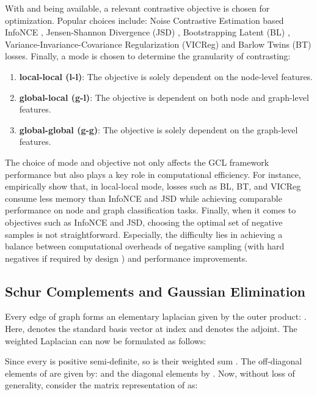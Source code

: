 \documentclass{article}
\theoremstyle{plain}
\theoremstyle{definition}
\theoremstyle{remark}
\begin{document}
With  and  being available, a relevant contrastive objective is chosen for optimization. Popular choices include: Noise Contrastive Estimation based InfoNCE \cite{oord2018representation}, Jensen-Shannon Divergence (JSD) \cite{lin1991divergence}, Bootstrapping Latent (BL) \cite{grill2020bootstrap}, Variance-Invariance-Covariance Regularization (VICReg) \cite{bardes2021vicreg} and Barlow Twins (BT) \cite{zbontar2021barlow} losses. Finally, a mode is chosen to determine the granularity of contrasting:

\begin{enumerate}
    \item \textbf{local-local (l-l)}: The objective is solely dependent on the node-level features.
    \item \textbf{global-local (g-l)}: The objective is dependent on both node and graph-level features.
    \item \textbf{global-global (g-g)}: The objective is solely dependent on the graph-level features.
\end{enumerate}

The choice of mode and objective not only affects the GCL framework performance but also plays a key role in computational efficiency. For instance, \citet{zhu2021empirical} empirically show that, in local-local mode, losses such as BL, BT, and VICReg consume  less memory than InfoNCE and JSD while achieving comparable performance on node and graph classification tasks. Finally, when it comes to objectives such as InfoNCE and JSD, choosing the optimal set of negative samples is not straightforward. Especially, the difficulty lies in achieving a balance between computational overheads of negative sampling \citep{chuang2020debiased} (with hard negatives if required by design \citep{robinson2020contrastive}) and performance improvements.

\subsection{Schur Complements and Gaussian Elimination }

Every edge  of graph  forms an elementary laplacian given by the outer product:
. Here,  denotes the standard basis vector at index  and  denotes the adjoint. The weighted Laplacian  can now be formulated as follows:

Since every  is positive semi-definite, so is their weighted sum . The off-diagonal elements of  are given by:  and the diagonal elements by . Now, without loss of generality, consider the matrix representation of  as:
\end{document}
